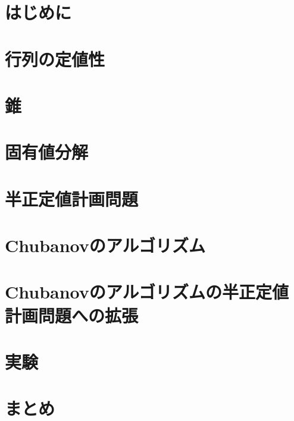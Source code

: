 \section{はじめに}


\section{行列の定値性}


\section{錐}


\section{固有値分解}


\section{半正定値計画問題}


\section{Chubanovのアルゴリズム}


\section{Chubanovのアルゴリズムの半正定値計画問題への拡張}


\section{実験}


\section{まとめ}


%

